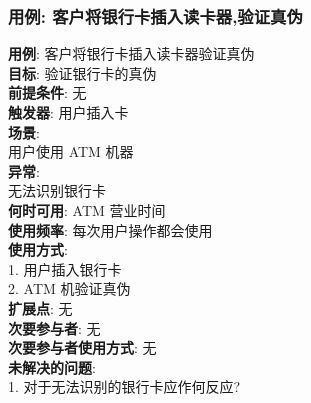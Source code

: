 \documentclass[UTF8]{article}
\begin{document}
\subsubsection{用例: 客户将银行卡插入读卡器,验证真伪}
\noindent
\textbf{用例}: 客户将银行卡插入读卡器验证真伪
\\
\textbf{目标}: 验证银行卡的真伪
\\
\textbf{前提条件}: 无
\\
\textbf{触发器}: 用户插入卡
\\
\textbf{场景}: \\
	\hspace*{2em} 用户使用 ATM 机器 \\
\textbf{异常}: \\
	\hspace*{2em} 无法识别银行卡 \\
\textbf{何时可用}: ATM 营业时间
\\
\textbf{使用频率}: 每次用户操作都会使用
\\
\textbf{使用方式}:\\
	\hspace*{2em}1. 用户插入银行卡 \\
	\hspace*{2em}2. ATM 机验证真伪 \\
\textbf{扩展点}: 无
\\
\textbf{次要参与者}: 无
\\
\textbf{次要参与者使用方式}: 无
\\
\textbf{未解决的问题}: \\
	\hspace*{2em}1. 对于无法识别的银行卡应作何反应?
	
\end{document}

